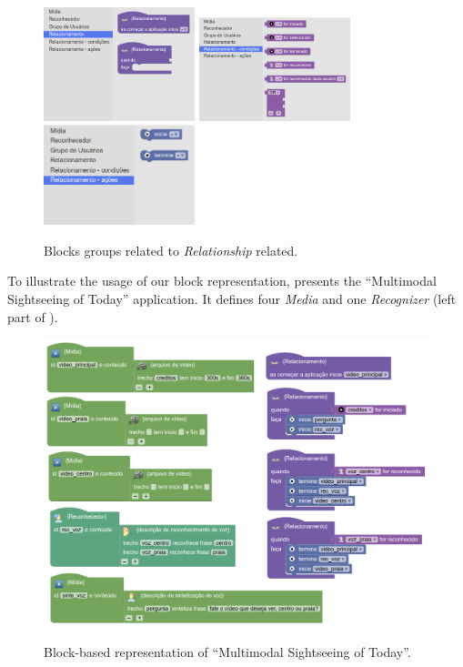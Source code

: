 \begin{figure}[!ht]
\begin{center}
	\includegraphics[width=4.4cm, keepaspectratio]{img/img14a.png}
	\includegraphics[width=4.4cm, keepaspectratio]{img/img14b.png}
	\includegraphics[width=4.4cm, keepaspectratio]{img/img14c.png}
	\caption{Blocks groups related to \textit{Relationship} related.}
	\label{fig:blocks1}
	\captionvspace
\end{center}
\end{figure}

To illustrate the usage of our block representation,  presents
the “Multimodal Sightseeing of Today” application. It defines four
\textit{Media} and one
\textit{Recognizer} (left part of ).

\begin{figure}[!ht]
  \begin{center}
    \includegraphics[width=14cm, keepaspectratio]{img/img15.png}
    \captionvspace
    \caption{Block-based representation of “Multimodal Sightseeing of Today”.}
    \captionvspace
    \label{fig:blocks2}
  \end{center}
\end{figure}

